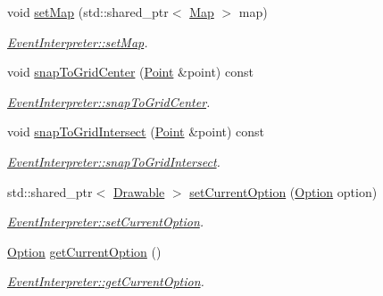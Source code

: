 \begin{DoxyCompactItemize}
\item 
void \hyperlink{classEventInterpreter_a6ca1d621b8ef0297675be928b996ae8b}{set\-Map} (std\-::shared\-\_\-ptr$<$ \hyperlink{classMap}{Map} $>$ map)
\begin{DoxyCompactList}\small\item\em \hyperlink{classEventInterpreter_a6ca1d621b8ef0297675be928b996ae8b}{Event\-Interpreter\-::set\-Map}. \end{DoxyCompactList}\item 
void \hyperlink{classEventInterpreter_ae5b4f14200e6ce7202852306194ee767}{snap\-To\-Grid\-Center} (\hyperlink{classPoint}{Point} \&point) const 
\begin{DoxyCompactList}\small\item\em \hyperlink{classEventInterpreter_ae5b4f14200e6ce7202852306194ee767}{Event\-Interpreter\-::snap\-To\-Grid\-Center}. \end{DoxyCompactList}\item 
void \hyperlink{classEventInterpreter_a538d5fd0db5b5ffccb72381d889970a8}{snap\-To\-Grid\-Intersect} (\hyperlink{classPoint}{Point} \&point) const 
\begin{DoxyCompactList}\small\item\em \hyperlink{classEventInterpreter_a538d5fd0db5b5ffccb72381d889970a8}{Event\-Interpreter\-::snap\-To\-Grid\-Intersect}. \end{DoxyCompactList}\item 
std\-::shared\-\_\-ptr$<$ \hyperlink{classDrawable}{Drawable} $>$ \hyperlink{classEventInterpreter_aba8f008c996f9f73b5d3420ff1231869}{set\-Current\-Option} (\hyperlink{classEventInterpreter_a1b63d40701a33e256a8cbbf44c6be8d2}{Option} option)
\begin{DoxyCompactList}\small\item\em \hyperlink{classEventInterpreter_aba8f008c996f9f73b5d3420ff1231869}{Event\-Interpreter\-::set\-Current\-Option}. \end{DoxyCompactList}\item 
\hyperlink{classEventInterpreter_a1b63d40701a33e256a8cbbf44c6be8d2}{Option} \hyperlink{classEventInterpreter_a9caa73a223dcaa65d1ec6e06398d9b61}{get\-Current\-Option} ()
\begin{DoxyCompactList}\small\item\em \hyperlink{classEventInterpreter_a9caa73a223dcaa65d1ec6e06398d9b61}{Event\-Interpreter\-::get\-Current\-Option}. \end{DoxyCompactList}\end{DoxyCompactItemize}


